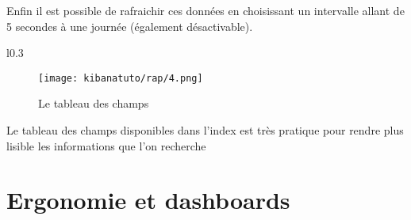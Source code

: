 Enfin il est possible de rafraichir ces données en choisissant un intervalle allant
de 5 secondes à une journée (également désactivable).
\newpage
\begin{wrapfigure}{l}{0.3\textwidth}
\begin{figure}[H]
\texttt{[image: kibanatuto/rap/4.png]}
\label{fig:kibanatuto4}
\caption{Le tableau des champs}
\end{figure}
\end{wrapfigure}
Le tableau des champs disponibles dans l'index est très pratique pour rendre plus 
lisible les informations que l'on recherche


\section{Ergonomie et dashboards}
